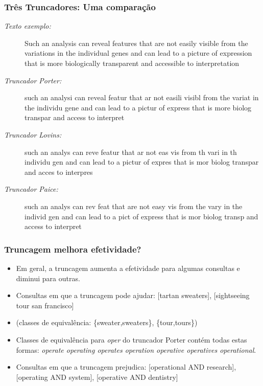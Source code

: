 \documentclass[compress]{beamer}
\begin{document}
\begin{frame}[shrink=10]
\frametitle{Três Truncadores: Uma comparação}

\begin{description}

\item[\emph{Texto exemplo:}]
Such an analysis can reveal features that are not easily visible from
the variations in the individual genes and can lead to a picture of
expression that is more biologically transparent and accessible to
interpretation

\item[\emph{Truncador Porter:}]
such an analysi can reveal featur that ar not easili visibl from the
variat in the individu gene and can lead to a pictur of express that is
more biolog transpar and access to interpret

\item[\emph{Truncador Lovins:}]
such an analys can reve featur that ar not eas vis from
th vari in th individu gen and can lead to a pictur of
expres that is mor biolog transpar and acces to
interpres

\item[\emph{Truncador Paice:}]
such an analys can rev feat that are not easy vis from 
the vary in the individ gen and can lead to a pict of 
express that is mor biolog transp and access to 
interpret 

\end{description}

\end{frame}

\begin{frame}
\frametitle{Truncagem melhora efetividade?}
\begin{itemize}[<+->]
\item Em geral,  a truncagem aumenta a efetividade para algumas 
consultas  e diminui para outras.
\item Consultas em que a truncagem pode ajudar: [tartan
  sweaters], [sightseeing tour san francisco]
\item (classes de equivalência: \{sweater,sweaters\}, \{tour,tours\})
\item Classes de equivalência para \emph{oper} do truncador Porter 
 contém todas estas formas: \emph{
operate operating operates operation operative operatives operational}.
\item Consultas em que a truncagem prejudica: [operational AND research], 
[operating
  AND system], [operative AND dentistry]
\end{itemize}
\end{frame}
\end{document}
